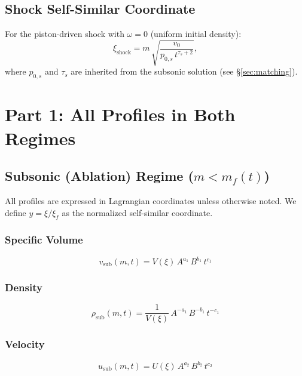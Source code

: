 \documentclass[11pt]{article}
\newcommand{\xsi}{\xi}
\newcommand{\xsif}{\xi_f}
\begin{document}
\subsection{Shock Self-Similar Coordinate}

For the piston-driven shock with $\omega = 0$ (uniform initial density):
\begin{equation}
  \xsi_{\mathrm{shock}} = m\,\sqrt{\frac{v_0}{p_{0,s}\,t^{\tau_s+2}}},
\end{equation}
where $p_{0,s}$ and $\tau_s$ are inherited from the subsonic solution (see \S\ref{sec:matching}).

\section{Part 1: All Profiles in Both Regimes}
\label{sec:profiles}

\subsection{Subsonic (Ablation) Regime ($m < m_f(t)$)}

All profiles are expressed in Lagrangian coordinates unless otherwise noted. We define $y = \xsi/\xsif$ as the normalized self-similar coordinate.

\subsubsection{Specific Volume}
\begin{equation}
  \boxed{v_{\mathrm{sub}}(m,t) = V(\xsi)\,A^{a_1}\,B^{b_1}\,t^{c_1}}
\end{equation}

\subsubsection{Density}
\begin{equation}
  \boxed{\rho_{\mathrm{sub}}(m,t) = \frac{1}{V(\xsi)}\,A^{-a_1}\,B^{-b_1}\,t^{-c_1}}
\end{equation}

\subsubsection{Velocity}
\begin{equation}
  \boxed{u_{\mathrm{sub}}(m,t) = U(\xsi)\,A^{a_2}\,B^{b_2}\,t^{c_2}}
\end{equation}
\end{document}
